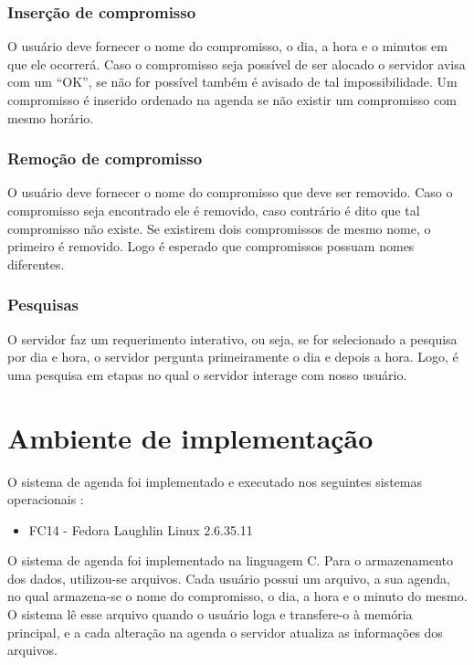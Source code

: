 \documentclass[10pt,a4paper]{article}
\begin{document}
\subsubsection{Inserção de compromisso}
O usuário deve fornecer o nome do compromisso, o dia, a hora e o
minutos em que ele ocorrerá.
Caso o compromisso seja possível de ser alocado o servidor avisa com
um ``OK'', se não for possível também é avisado de tal impossibilidade.
Um compromisso é inserido ordenado na agenda se não existir um
compromisso com mesmo horário.

\subsubsection{Remoção de compromisso}
O usuário deve fornecer o nome do compromisso que deve ser removido.
Caso o compromisso seja encontrado ele é removido, caso contrário é
dito que tal compromisso não existe.
Se existirem dois compromissos de mesmo nome, o primeiro é removido.
Logo é esperado que compromissos possuam nomes diferentes.


\subsubsection{Pesquisas}
O servidor faz um requerimento interativo, ou seja, se for selecionado
a pesquisa por dia e hora, o servidor pergunta primeiramente o dia e
depois a hora. Logo, é uma pesquisa em etapas no qual o servidor
interage com nosso usuário.

\section{Ambiente de implementação}
O sistema de agenda foi implementado e executado nos seguintes sistemas operacionais :
\begin{itemize}
\item FC14 - Fedora Laughlin Linux 2.6.35.11
\end{itemize}

O sistema de agenda foi implementado na linguagem C.
Para o armazenamento dos dados, utilizou-se arquivos. Cada usuário
possui um arquivo, a sua agenda, no qual armazena-se o nome do
compromisso, o dia, a hora e o minuto do mesmo.
O sistema lê esse arquivo quando o usuário loga e transfere-o à
memória principal, e a cada alteração na agenda o servidor atualiza as informações dos arquivos.
\end{document}
